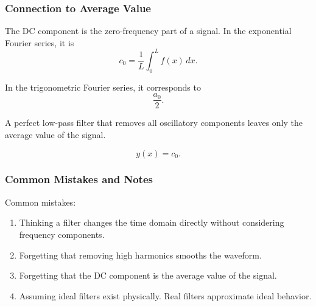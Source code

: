 \subsubsection*{Connection to Average Value}

The DC component is the zero-frequency part of a signal. In the exponential Fourier series, it is
\[
    c_0=\frac{1}{L}\int_0^L f(x)\,dx.
\]

In the trigonometric Fourier series, it corresponds to
\[
    \frac{a_0}{2}.
\]

A perfect low-pass filter that removes all oscillatory components leaves only the average value of the signal.

\[
    y(x)=c_0.
\]

\subsubsection*{Common Mistakes and Notes}

\begin{conceptbox}
    Common mistakes:
    \begin{enumerate}
        \item Thinking a filter changes the time domain directly without considering frequency components.
        \item Forgetting that removing high harmonics smooths the waveform.
        \item Forgetting that the DC component is the average value of the signal.
        \item Assuming ideal filters exist physically. Real filters approximate ideal behavior.
    \end{enumerate}
\end{conceptbox}